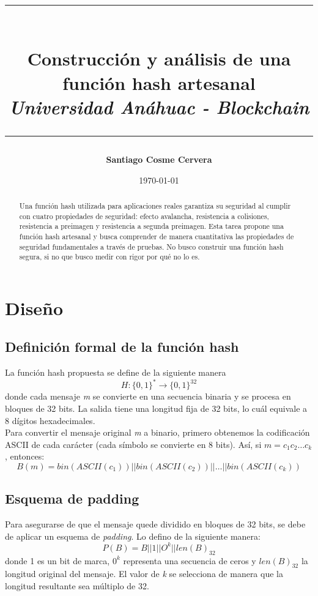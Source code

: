 \documentclass[11pt, letterpaper]{article}
\title{
    \rule{\linewidth}{0.4mm} \\[0.4cm] %
    \huge \textbf{Construcción y análisis de una función hash artesanal} \\[0.2cm]
    \Large \textit{ Universidad Anáhuac - Blockchain} \\[0.1cm]
    \rule{\linewidth}{0.4mm} %
}
\author{
    \textbf{Santiago Cosme Cervera} \\
}
\date{\today}
\begin{document}
\maketitle %

\begin{abstract}
    Una función hash utilizada para aplicaciones reales garantiza 
    su seguridad al cumplir con cuatro propiedades de seguridad: 
    efecto avalancha, resistencia a colisiones, resistencia a preimagen y resistencia a segunda preimagen.
    Esta tarea propone una función hash artesanal y busca comprender de manera cuantitativa
    las propiedades de seguridad fundamentales a través de pruebas. No busco construir una función
    hash segura, si no que busco medir con rigor por qué no lo es. 
\end{abstract}

\section{Diseño}
\subsection{Definición formal de la función hash}
La función hash propuesta se define de la siguiente manera
\begin{equation}
    H : \{0, 1\}^* \rightarrow \{0, 1\}^{32}
\end{equation}
donde cada mensaje \textit{m} se convierte en una secuencia binaria y se procesa en bloques de 32 bits. La salida
tiene una longitud fija de 32 bits, lo cuál equivale a 8 dígitos hexadecimales.\\

Para convertir el mensaje original \textit{m} a binario, primero obtenemos la codificación ASCII de cada carácter (cada símbolo se convierte en 8 bits).
Así, si $m = c_1 c_2 \dots c_k$, entonces:
\begin{equation}
    B(m) = bin(ASCII(c_1)) || bin(ASCII(c_2)) || \dots || bin(ASCII(c_k))
\end{equation}

\subsection{Esquema de padding}
Para asegurarse de que el mensaje quede dividido en bloques de 32 bits, se debe de aplicar un esquema de \textit{padding}.
Lo defino de la siguiente manera:
\begin{equation}
    P(B) = B || 1 || O^k || len(B)_{32}
\end{equation}
donde 1 es un bit de marca, $0^k$ representa una secuencia de ceros y $len(B)_{32}$ la longitud original del mensaje. El valor de \textit{k} se selecciona de manera que la longitud resultante sea múltiplo de 32. 
\end{document}
